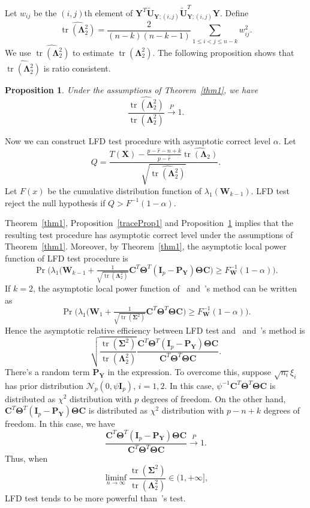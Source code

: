 \documentclass[12pt]{article} %
\DeclareMathOperator{\mytr}{tr}
\newcommand{\bX}{\mathbf{X}}
\newcommand{\bP}{\mathbf{P}}
\newcommand{\bY}{\mathbf{Y}}
\newcommand{\bC}{\mathbf{C}}
\newcommand{\bI}{\mathbf{I}}
\newcommand{\bU}{\mathbf{U}}
\newcommand{\bW}{\mathbf{W}}
\newcommand{\bfsym}[1]{\ensuremath{\boldsymbol{#1}}}
\def\bLambda {\bfsym {\Lambda}}
\def\bSigma {\bfsym {\Sigma}}
\def\bTheta {\bfsym {\Theta}}
\newtheorem{proposition}{Proposition}
\theoremstyle{definition}
\begin{document}
    Let $w_{ij}$ be the $(i,j)$th element of $\bY^T \tilde{\bU}_{\bY;(i,j)} \tilde{\bU}_{\bY;(i,j)}^T \bY$.
    Define
    $$
    \widehat{\mytr(\bLambda_2^2)}=\frac{2}{(n-k)(n-k-1)}\sum_{1\leq i<j\leq n-k}w_{ij}^2.
    $$
    We use $\widehat{\mytr(\bLambda_2^2)}$ to estimate $\mytr(\bLambda_2^2)$.
    The following proposition shows that $\widehat{\mytr(\bLambda_2^2)}$ is  ratio consistent.
    \begin{proposition}\label{Taichangle}
        Under the assumptions of Theorem~\ref{thm1}, we have
        $$
        \frac{\widehat{\mytr(\bLambda^2_2)}}{\mytr(\bLambda^2_2)} \xrightarrow{P} 1.
        $$

    \end{proposition}


Now we can construct LFD test procedure with asymptotic correct level $\alpha$. Let 
$$
Q=\frac{T(\bX)-\frac{p-\hat{r}-n+k}{p-\hat{r}}\widehat{\mytr(\bLambda_2)}}{\sqrt{\widehat{\mytr(\bLambda_2^2)}}}.
$$
Let $F(x)$ be the cumulative distribution function of $\lambda_{1}(\bW_{k-1})$.
LFD test reject the null hypothesis if $Q> F^{-1}(1-\alpha)$.

Theorem~\ref{thm1}, Proposition~\ref{traceProp1} and Proposition~\ref{Taichangle} implies that the resulting test procedure has asymptotic correct level under the assumptions of Theorem~\ref{thm1}.
Moreover, by Theorem~\ref{thm1}, the asymptotic local power function of LFD test procedure is
$$
\Pr\Big(
        \lambda_{1}\big(\bW_{k-1}+\tfrac{1}{\sqrt{\mytr(\bLambda_2^2)}} \bC^T \bTheta^T (\bI_p-\bP_{\bY})\bTheta \bC\big)\geq F_{\bW}^{-1}(1-\alpha)
\Big).
$$
If $k=2$, the asymptotic local power function of~\cite{Bai1996Efiect} and~\cite{Chen2010A}'s method can be written as
$$
\Pr\Big(
        \lambda_{1}\big(\bW_{1}+\tfrac{1}{\sqrt{\mytr(\bSigma^2)}} \bC^T \bTheta^T \bTheta \bC\big)\geq F_{\bW}^{-1}(1-\alpha)
\Big).
$$
Hence the asymptotic relative efficiency between LFD test and~\cite{Bai1996Efiect} and~\cite{Chen2010A}'s method is
$$
 \sqrt{\frac{{{\mytr(\bSigma^2)}}}{{\mytr(\bLambda_2^2)}}}
\frac{ \bC^T \bTheta^T (\bI_p-\bP_{\bY})\bTheta \bC}{ {\bC^T \bTheta^T \bTheta \bC}}.
$$
There's a random term $\bP_{\bY}$ in the expression.
To overcome this,
suppose $\sqrt{n_i} \xi_i$ has prior distribution $\mathcal{N}_p(0,\psi \bI_p)$, $i=1,2$.
In this case,
$
\psi^{-1}\bC^T \bTheta^T \bTheta \bC$
is distributed as $\chi^2$ distribution with $p$ degrees of freedom.
On the other hand,
$\bC^T \bTheta^T (\bI_p-\bP_{\bY})\bTheta \bC$  is distributed as 
$\chi^2$ distribution with $p-n+k$ degrees of freedom.
In this case, we have
$$
\frac{\bC^T \bTheta^T (\bI_p-\bP_{\bY})\bTheta \bC}{\bC^T \bTheta^T \bTheta \bC}\xrightarrow{P}1.
$$
Thus, when
$$
\liminf_{n\to \infty}\frac{{{\mytr(\bSigma^2)}}}{{\mytr(\bLambda_2^2)}}\in(1,+\infty],
$$
LFD test tends to be more powerful than~\cite{Chen2010A}'s test.
\end{document}
